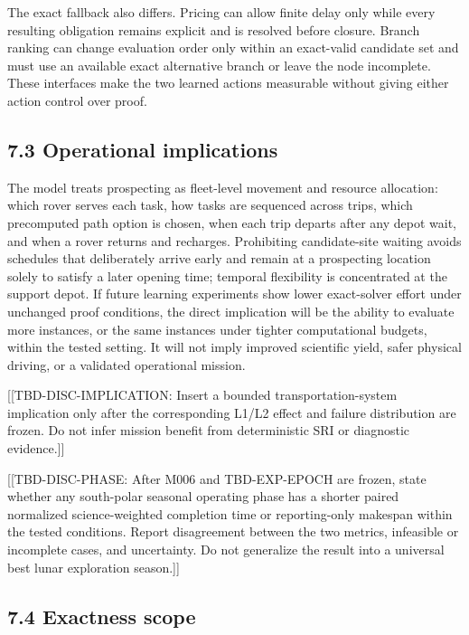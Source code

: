 \documentclass[
  11pt,
]{article}
\begin{document}
The exact fallback also differs. Pricing can allow finite delay only
while every resulting obligation remains explicit and is resolved before
closure. Branch ranking can change evaluation order only within an
exact-valid candidate set and must use an available exact alternative
branch or leave the node incomplete. These interfaces make the two
learned actions measurable without giving either action control over
proof.

\hypertarget{operational-implications}{%
\subsection{7.3 Operational
implications}\label{operational-implications}}

The model treats prospecting as fleet-level movement and resource
allocation: which rover serves each task, how tasks are sequenced across
trips, which precomputed path option is chosen, when each trip departs
after any depot wait, and when a rover returns and recharges.
Prohibiting candidate-site waiting avoids schedules that deliberately
arrive early and remain at a prospecting location solely to satisfy a
later opening time; temporal flexibility is concentrated at the support
depot. If future learning experiments show lower exact-solver effort
under unchanged proof conditions, the direct implication will be the
ability to evaluate more instances, or the same instances under tighter
computational budgets, within the tested setting. It will not imply
improved scientific yield, safer physical driving, or a validated
operational mission.

{[}{[}TBD-DISC-IMPLICATION: Insert a bounded transportation-system
implication only after the corresponding L1/L2 effect and failure
distribution are frozen. Do not infer mission benefit from deterministic
SRI or diagnostic evidence.{]}{]}

{[}{[}TBD-DISC-PHASE: After M006 and TBD-EXP-EPOCH are frozen, state
whether any south-polar seasonal operating phase has a shorter paired
normalized science-weighted completion time or reporting-only makespan
within the tested conditions. Report disagreement between the two
metrics, infeasible or incomplete cases, and uncertainty. Do not
generalize the result into a universal best lunar exploration
season.{]}{]}

\hypertarget{exactness-scope}{%
\subsection{7.4 Exactness scope}\label{exactness-scope}}
\end{document}
